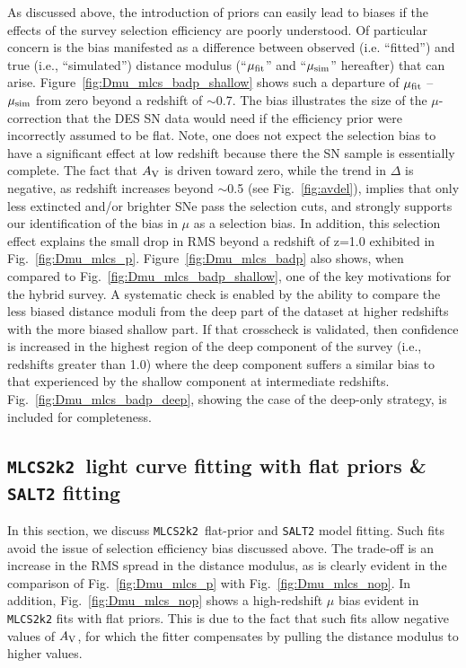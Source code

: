 \documentclass[preprint2]{aastex}    %
\newcommand\av{$A_{\rm V}$}
\newcommand{\mlcs}{{\tt MLCS2k2}}
\newcommand{\salt}{{\tt SALT2}}
\begin{document}
As discussed above, the introduction of priors can easily lead to biases if the 
effects of the survey selection efficiency are poorly understood. 
Of particular concern is the bias manifested as a difference between observed 
(i.e. ``fitted'') and true (i.e., ``simulated'') distance modulus (``$\mu_{\rm fit}$'' 
and ``$\mu_{\rm sim}$'' hereafter) that can arise. Figure~\ref{fig:Dmu_mlcs_badp_shallow} 
shows such a departure of $\mu_{\rm fit}$ -- $\mu_{\rm sim}$ from zero 
beyond a redshift of $\sim$0.7. The bias illustrates the size of the $\mu$-correction 
that the DES SN data would need if the efficiency prior were incorrectly assumed to be flat.
Note, one does not expect the selection bias to have a significant effect at low redshift 
because there the SN sample is essentially complete. The fact that $A_{\rm V}$ is 
driven toward zero, while the trend in $\Delta$ is negative, as redshift increases 
beyond $\sim$0.5 (see Fig.~\ref{fig:avdel}), implies that only less extincted 
and/or brighter SNe pass the selection cuts, and strongly supports our 
identification of the bias in $\mu$ as a selection bias. In addition, this selection effect explains
the small drop in RMS beyond a redshift of z=1.0 exhibited in Fig.~\ref{fig:Dmu_mlcs_p}. Figure~\ref{fig:Dmu_mlcs_badp} 
also shows, when compared to Fig.~\ref{fig:Dmu_mlcs_badp_shallow}, one of the key motivations for 
the hybrid survey. A systematic check is enabled by the ability to compare the less biased 
distance moduli from the deep part of the 
dataset at higher redshifts with the more biased shallow part. If that crosscheck is validated,
then confidence is increased in the highest region of the deep component of the survey (i.e., redshifts greater 
than 1.0) where the deep component suffers a similar bias to that experienced by the shallow
component at intermediate redshifts.
Fig.~\ref{fig:Dmu_mlcs_badp_deep}, showing the case of the deep-only strategy, 
is included for completeness. 

\subsection{\mlcs\ light curve fitting with flat priors \& {\salt} fitting}\label{sec:lcfit_nop}
In this section, we discuss \mlcs\ flat-prior and {\salt} model fitting. 
Such fits avoid the issue of selection efficiency bias discussed above. 
The trade-off is an increase in the RMS spread in the distance modulus, as is clearly 
evident in the comparison of Fig.~\ref{fig:Dmu_mlcs_p} with Fig.~\ref{fig:Dmu_mlcs_nop}. 
In addition, Fig.~\ref{fig:Dmu_mlcs_nop} shows a high-redshift $\mu$ bias evident in {\mlcs} fits 
with flat priors. This is due to the fact that such fits allow negative values of \av, for which
the fitter compensates by pulling the distance modulus to higher values.
\end{document}
